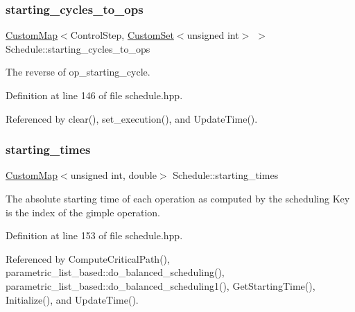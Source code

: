 \subsubsection{\texorpdfstring{starting\+\_\+cycles\+\_\+to\+\_\+ops}{starting\_cycles\_to\_ops}}
{\footnotesize\ttfamily \hyperlink{custom__map_8hpp_a18ca01763abbe3e5623223bfe5aaac6b}{Custom\+Map}$<$Control\+Step, \hyperlink{custom__set_8hpp_a615bc2f42fc38a4bb1790d12c759e86f}{Custom\+Set}$<$unsigned int$>$ $>$ Schedule\+::starting\+\_\+cycles\+\_\+to\+\_\+ops\hspace{0.3cm}{\ttfamily [private]}}



The reverse of op\+\_\+starting\+\_\+cycle. 



Definition at line 146 of file schedule.\+hpp.



Referenced by clear(), set\+\_\+execution(), and Update\+Time().

\mbox{\label{classSchedule_a5204aafc8e7b40a16118dba7e66ba104}} 
\subsubsection{\texorpdfstring{starting\+\_\+times}{starting\_times}}
{\footnotesize\ttfamily \hyperlink{custom__map_8hpp_a18ca01763abbe3e5623223bfe5aaac6b}{Custom\+Map}$<$unsigned int, double$>$ Schedule\+::starting\+\_\+times\hspace{0.3cm}{\ttfamily [private]}}



The absolute starting time of each operation as computed by the scheduling Key is the index of the gimple operation. 



Definition at line 153 of file schedule.\+hpp.



Referenced by Compute\+Critical\+Path(), parametric\+\_\+list\+\_\+based\+::do\+\_\+balanced\+\_\+scheduling(), parametric\+\_\+list\+\_\+based\+::do\+\_\+balanced\+\_\+scheduling1(), Get\+Starting\+Time(), Initialize(), and Update\+Time().

\mbox{\label{classSchedule_aee5739d5062edd0854fda0745f270e8a}} 
